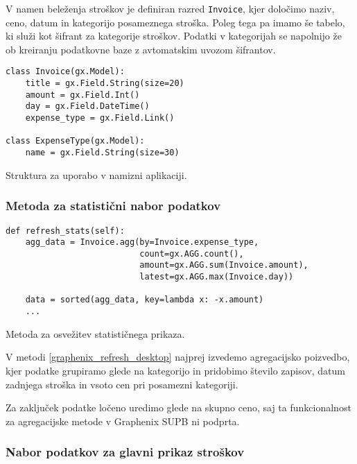 \documentclass[a4paper,12pt,openright]{book}
\begin{document}
    V namen beleženja stroškov je definiran razred {\tt Invoice}, kjer določimo naziv, ceno, datum in kategorijo posameznega stroška.
    Poleg tega pa imamo še tabelo, ki služi kot šifrant za kategorije stroškov. Podatki v kategorijah se napolnijo že ob kreiranju podatkovne baze z avtomatskim uvozom šifrantov.
    
\begin{code}
\begin{verbatim}
class Invoice(gx.Model):
    title = gx.Field.String(size=20)
    amount = gx.Field.Int()
    day = gx.Field.DateTime()
    expense_type = gx.Field.Link()

class ExpenseType(gx.Model):
    name = gx.Field.String(size=30)
\end{verbatim}
\caption{Struktura za uporabo v namizni aplikaciji.}
\label{graphenix_schema_desktop}
\end{code}

    \subsubsection{Metoda za statistični nabor podatkov}

\begin{code}
\begin{verbatim}
def refresh_stats(self):
    agg_data = Invoice.agg(by=Invoice.expense_type,
                           count=gx.AGG.count(), 
                           amount=gx.AGG.sum(Invoice.amount), 
                           latest=gx.AGG.max(Invoice.day))
    
    data = sorted(agg_data, key=lambda x: -x.amount)
    ...
\end{verbatim}
\caption{Metoda za osvežitev statističnega prikaza.}
\label{graphenix_refresh_desktop}
\end{code}

    \noindent
    V metodi \ref{graphenix_refresh_desktop} najprej izvedemo agregacijsko poizvedbo, kjer podatke grupiramo glede na kategorijo in pridobimo število zapisov, datum zadnjega stroška in vsoto cen pri posamezni kategoriji.

    Za zaključek podatke ločeno uredimo glede na skupno ceno, saj ta funkcionalnost za agregacijske metode v Graphenix SUPB ni podprta.

    \newpage
    \subsubsection{Nabor podatkov za glavni prikaz stroškov}
\end{document}
